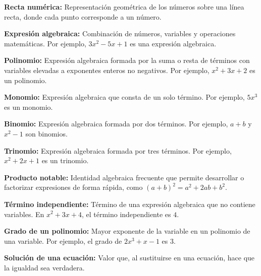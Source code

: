 \documentclass[12pt,final]{report}
\theoremstyle{plain}
\theoremstyle{definition}
\begin{document}
\textbf{Recta numérica:} Representación geométrica de los números sobre una línea recta, donde cada punto corresponde a un número.

\vspace{0.5em}

\textbf{Expresión algebraica:} Combinación de números, variables y operaciones matemáticas. Por ejemplo, $3x^2-5x+1$ es una expresión algebraica.

\vspace{0.5em}

\textbf{Polinomio:} Expresión algebraica formada por la suma o resta de términos con variables elevadas a exponentes enteros no negativos. Por ejemplo, $x^2+3x+2$ es un polinomio.

\vspace{0.5em}

\textbf{Monomio:} Expresión algebraica que consta de un solo término. Por ejemplo, $5x^3$ es un monomio.

\vspace{0.5em}

\textbf{Binomio:} Expresión algebraica formada por dos términos. Por ejemplo, $a+b$ y $x^2-1$ son binomios.

\vspace{0.5em}

\textbf{Trinomio:} Expresión algebraica formada por tres términos. Por ejemplo, $x^2+2x+1$ es un trinomio.

\vspace{0.5em}

\textbf{Producto notable:} Identidad algebraica frecuente que permite desarrollar o factorizar expresiones de forma rápida, como $(a+b)^2=a^2+2ab+b^2$.

\vspace{0.5em}

\textbf{Término independiente:} Término de una expresión algebraica que no contiene variables. En $x^2+3x+4$, el término independiente es $4$.

\vspace{0.5em}

\textbf{Grado de un polinomio:} Mayor exponente de la variable en un polinomio de una variable. Por ejemplo, el grado de $2x^3+x-1$ es $3$.

\vspace{0.5em}

\textbf{Solución de una ecuación:} Valor que, al sustituirse en una ecuación, hace que la igualdad sea verdadera.
\end{document}
